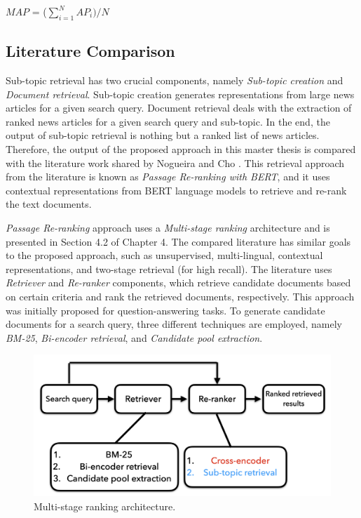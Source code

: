 \centerline{$MAP$ = ($\sum\limits_{i=1}^N AP_i) /N$}

\subsection{Literature Comparison}

Sub-topic retrieval has two crucial components, namely \textit{Sub-topic creation} and \textit{Document retrieval}. Sub-topic creation generates representations from large news articles for a given search query. Document retrieval deals with the extraction of ranked news articles for a given search query and sub-topic. In the end, the output of sub-topic retrieval is nothing but a ranked list of news articles. Therefore, the output of the proposed approach in this master thesis is compared with the literature work shared by Nogueira and Cho \cite{nogueira2019passage}. This retrieval approach from the literature is known as \textit{Passage Re-ranking with \ac{BERT}}, and it uses contextual representations from \ac{BERT} language models to retrieve and re-rank the text documents.



\textit{Passage Re-ranking} approach uses a \textit{Multi-stage ranking} architecture and is presented in Section 4.2 of Chapter 4. The compared literature has similar goals to the proposed approach, such as unsupervised, multi-lingual, contextual representations, and two-stage retrieval (for high recall). The literature uses \textit{Retriever} and \textit{Re-ranker} components, which retrieve candidate documents based on certain criteria and rank the retrieved documents, respectively. This approach was initially proposed for question-answering tasks. To generate candidate documents for a search query, three different techniques are employed, namely \textit{BM-25}, \textit{Bi-encoder retrieval}, and \textit{Candidate pool extraction}.


\begin{figure}[h]
	\centering
	\includegraphics[width=.9\textwidth]{images/thesis_images/literature_review.png}
	\caption{Multi-stage ranking architecture. \label{fig:literature_review}}
\end{figure}

